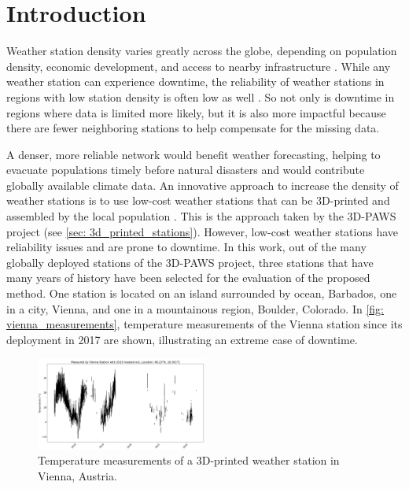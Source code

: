 \section{Introduction}
\label{sec: introduction}


Weather station density varies greatly across the globe, depending on population density, economic development, and access to nearby infrastructure \cite{ortizbobea2021}.
While any weather station can experience downtime, the reliability of weather stations in regions with low station density is often low as well \cite{Mistry2022GlobalWS}.
So not only is downtime in regions where data is limited more likely, but it is also more impactful because there are fewer neighboring stations to help compensate for the missing data.

A denser, more reliable network would benefit weather forecasting, helping to evacuate populations timely before natural disasters \cite{muita2021} and would contribute globally available climate data.
An innovative approach to increase the density of weather stations is to use low-cost weather stations that can be 3D-printed and assembled by the local population \cite{muita2021}. This is the approach taken by the 3D-PAWS project (see \autoref{sec: 3d_printed_stations}).
However, low-cost weather stations have reliability issues and are prone to downtime.
In this work, out of the many globally deployed stations of the 3D-PAWS project, three stations that have many years of history have been selected for the evaluation of the proposed method.
One station is located on an island surrounded by ocean, Barbados, one in a city, Vienna, and one in a mountainous region, Boulder, Colorado. In \autoref{fig: vienna_measurements}, temperature measurements of the Vienna station since its deployment in 2017 are shown, illustrating an extreme case of downtime.

\begin{figure}[H]
    \centering
    \includegraphics[width=0.5\textwidth]{resources/images/charts/vienna_available_measurements_bw.png}
    \caption{Temperature measurements of a 3D-printed weather station in Vienna, Austria.}
    \label{fig: vienna_measurements}
\end{figure}

